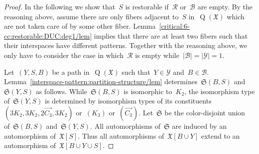\documentclass[english,a4paper]{article}
\theoremstyle{plain}
\theoremstyle{definition}
\newcommand{\coherentConfig}{\ensuremath{\mathfrak{X}}}
\newcommand{\inducedCC}[1]{\ensuremath{\coherentConfig[#1]}}
\DeclareMathOperator*{\Quotient}{Q}
\newcommand{\quotientGraph}[1]{\ensuremath{\Quotient(#1)}}
\newcommand{\partitionStructure}[1]{\ensuremath{\mathfrak{S}(#1)}}
\begin{document}
\begin{proof}
    In the following we show that~$S$ is restorable if~$\mathcal{R}$ or~$\mathcal{B}$ are empty.
    By the reasoning above, assume there are only fibers adjacent to~$S$ in~$\quotientGraph{\coherentConfig}$ which are not taken care of by some other fiber.
    Lemma~\ref{critical:6-cc:restorable:DUC:deg1/lem} implies that there are at least two fibers such that their interspaces have different patterns.
    Together with the reasoning above, we only have to consider the case in which~$\mathcal{R}$ is empty while~$|\mathcal{B}| = |\mathcal{Y}| = 1$.

    Let~$(Y,S,B)$ be a path in~$\quotientGraph{\coherentConfig}$ such that~$Y \in \mathcal{Y}$ and~$B \in \mathcal{B}$.
    Lemma~\ref{interspace-pattern:partition-structure/lem} determines~$\partitionStructure{B,S}$ and~$\partitionStructure{Y,S}$ as follows.
    While~$\partitionStructure{B,S}$ is isomorphic to~$K_2$, the isomorphism type of~$\partitionStructure{Y,S}$ is determined by isomorphism types of its constituents~$(3K_2,3K_2,2\overrightarrow{C_3},3K_2)$ or~$(K_3)$ or~$(\overrightarrow{C_3})$.
    Let~$\mathfrak{S}$ be the color-disjoint union of~$\partitionStructure{B,S}$ and~$\partitionStructure{Y,S}$.
    All automorphisms of~$\mathfrak{S}$ are induced by an automorphism of~$\inducedCC{S}$.
    Thus all automorphisms of~$\inducedCC{B \cup Y}$ extend to an automorphism of~$\inducedCC{B \cup Y \cup S}$.
\end{proof}
\end{document}
